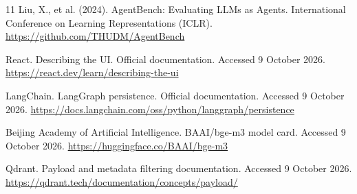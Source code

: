 \documentclass{article}
\begin{document}
\begin{thebibliography}{11}
 Liu, X., et al. (2024). AgentBench: Evaluating LLMs as Agents. International Conference on Learning Representations (ICLR). \url{https://github.com/THUDM/AgentBench}

 React. Describing the UI. Official documentation. Accessed 9 October 2026. \url{https://react.dev/learn/describing-the-ui}

 LangChain. LangGraph persistence. Official documentation. Accessed 9 October 2026. \url{https://docs.langchain.com/oss/python/langgraph/persistence}

 Beijing Academy of Artificial Intelligence. BAAI/bge-m3 model card. Accessed 9 October 2026. \url{https://huggingface.co/BAAI/bge-m3}

 Qdrant. Payload and metadata filtering documentation. Accessed 9 October 2026. \url{https://qdrant.tech/documentation/concepts/payload/}

\end{thebibliography}
\end{document}
